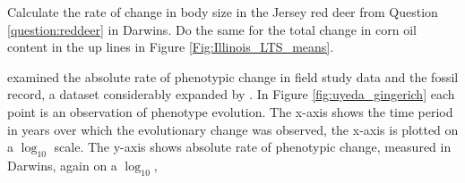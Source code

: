 \begin{question}{}
Calculate the rate of change in body size in the Jersey red deer from
Question \ref{question:reddeer} in Darwins. Do the same for the total
change in corn oil content in the up lines in Figure \ref{Fig:Illinois_LTS_means}.
  \end{question}

\citet{gingerich1983rates} examined the absolute rate of phenotypic
change in field study data and the fossil record, a dataset
considerably expanded by \citet{uyeda2011million}. In Figure
\ref{fig:uyeda_gingerich} each point is an observation of phenotype
evolution. The x-axis shows the time period in years over which the
evolutionary change was observed, the x-axis is plotted on a
$\log_{10}$ scale.  The y-axis shows absolute rate of phenotypic
change, measured in Darwins, again on a $\log_{10}$, 

